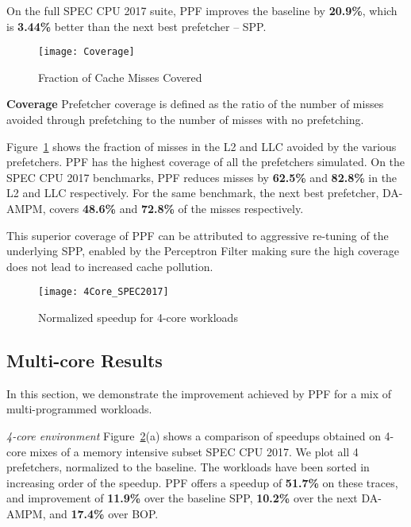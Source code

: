 On the full SPEC CPU 2017 suite, PPF improves the baseline by \textbf{20.9\%},
which is \textbf{3.44\%} better than the next best prefetcher -- SPP.

\begin{figure}[h]
\texttt{[image: Coverage]}
\caption{Fraction of Cache Misses Covered}
\label{Fig:Coverage}
\end{figure}


\textbf{Coverage}\newline
Prefetcher coverage is defined as the ratio of the number of misses avoided
through prefetching to the number of misses with no prefetching.

Figure~\ref{Fig:Coverage} shows the fraction of misses in the L2 and LLC
avoided by the various prefetchers.  PPF has the highest coverage of all the
prefetchers simulated. On the SPEC CPU 2017 benchmarks, PPF reduces misses by
\textbf{62.5\%} and \textbf{82.8\%} in the L2 and LLC respectively. For the
same benchmark, the next best prefetcher, DA-AMPM, covers \textbf{48.6\%} and
\textbf{72.8\%} of the misses respectively.

This superior coverage of PPF can be attributed to aggressive re-tuning of the
underlying SPP, enabled by the Perceptron Filter making sure the high coverage
does not lead to increased cache pollution.

\begin{figure}[h]
\texttt{[image: 4Core\_SPEC2017]}
\caption{Normalized speedup for 4-core workloads}
\label{Fig:4Core_SPEC2017}
\end{figure}

\subsection{Multi-core Results}
\label{Results-Multi}
In this section, we demonstrate the improvement achieved by PPF for a mix of
multi-programmed workloads.

\textit{4-core environment} Figure~\ref{Fig:4Core_SPEC2017}(a) shows a
comparison of speedups obtained on 4-core mixes of a memory intensive subset
SPEC CPU 2017.  We plot all 4 prefetchers, normalized to the baseline.  The
workloads have been sorted in increasing order of the speedup.  PPF offers a
speedup of \textbf{51.7\%} on these traces, and improvement of \textbf{11.9\%}
over the baseline SPP, \textbf{10.2\%} over the next DA-AMPM, and
\textbf{17.4\%} over BOP.

